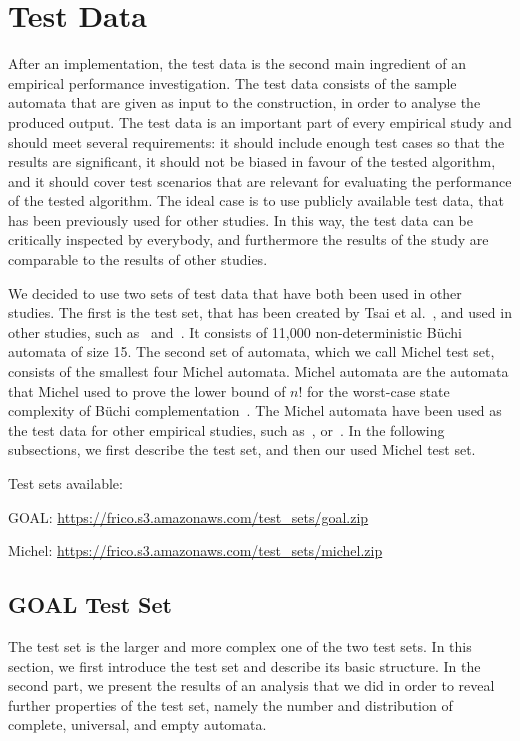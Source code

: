 \section{Test Data}
\label{4_test_data}
After an implementation, the test data is the second main ingredient of an empirical performance investigation. The test data consists of the sample automata that are given as input to the construction, in order to analyse the produced output. The test data is an important part of every empirical study and should meet several requirements: it should include enough test cases so that the results are significant, it should not be biased in favour of the tested algorithm, and it should cover test scenarios that are relevant for evaluating the performance of the tested algorithm. The ideal case is to use publicly available test data, that has been previously used for other studies. In this way, the test data can be critically inspected by everybody, and furthermore the results of the study are comparable to the results of other studies.

We decided to use two sets of test data that have both been used in other studies. The first is the \goal{} test set, that has been created by Tsai et al.~\cite{2011_tsai}, and used in other studies, such as~\cite{2012_breuers} and~\cite{2013_bsc_goettel}. It consists of 11,000 non-deterministic Büchi automata of size 15. The second set of automata, which we call Michel test set, consists of the smallest four Michel automata. Michel automata are the automata that Michel used to prove the lower bound of $n!$ for the worst-case state complexity of Büchi complementation~\cite{michel1988}. The Michel automata have been used as the test data for other empirical studies, such as~\cite{2006_althoff}, or~\cite{2013_bsc_goettel}. In the following subsections, we first describe the \goal{} test set, and then our used Michel test set.

Test sets available: 

GOAL: \url{https://frico.s3.amazonaws.com/test_sets/goal.zip}

Michel: \url{https://frico.s3.amazonaws.com/test_sets/michel.zip}


\subsection{GOAL Test Set}
\label{4_goal_testset}
The \goal{} test set is the larger and more complex one of the two test sets. In this section, we first introduce the \goal{} test set and describe its basic structure. In the second part, we present the results of an analysis that we did in order to reveal further properties of the \goal{} test set, namely the number and distribution of complete, universal, and empty automata.

